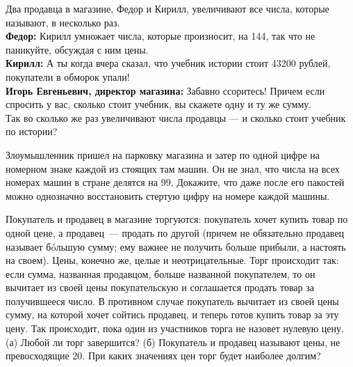 ﻿
\begin{enumerate}
\itA Два продавца в магазине, Федор и Кирилл, увеличивают все числа, которые называют, в несколько раз. \smallskip\\
{\bfseries Федор:} Кирилл умножает числа, которые произносит, на 144, так что не паникуйте, обсуждая с ним цены. \smallskip\\
{\bfseries Кирилл:} А ты когда вчера сказал, что учебник истории стоит 43200 рублей, покупатели в обморок упали! \smallskip\\
{\bfseries Игорь Евгеньевич, директор магазина:} Забавно ссоритесь! Причем если спросить у вас, сколько стоит учебник, вы скажете одну и ту же сумму. \smallskip\\
Так во сколько же раз увеличивают числа продавцы — и сколько стоит учебник по истории?

\itB Злоумышленник пришел на парковку магазина и затер по одной цифре на номерном знаке каждой из стоящих там машин. Он не знал, что числа на всех номерах машин в стране делятся на 99. Докажите, что даже после его пакостей можно однозначно восстановить стертую цифру на номере каждой машины.

\itC Покупатель и продавец в магазине торгуются: покупатель хочет купить товар по одной цене, а продавец~— продать по другой (причем не обязательно продавец называет б\'oльшую сумму; ему важнее не получить больше прибыли, а настоять на своем). Цены, конечно же, целые и неотрицательные. Торг происходит так: если сумма, названная продавцом, больше названной покупателем, то он вычитает из своей цены покупательскую и соглашается продать товар за получившееся число. В противном случае покупатель вычитает из своей цены сумму, на которой хочет сойтись продавец, и теперь готов купить товар за эту цену. Так происходит, пока один из участников торга не назовет нулевую цену. \smallskip\\
(а) Любой ли торг завершится? (б) Покупатель и продавец называют цены, не превосходящие 20. При каких значениях цен торг будет наиболее долгим?
\end{enumerate}